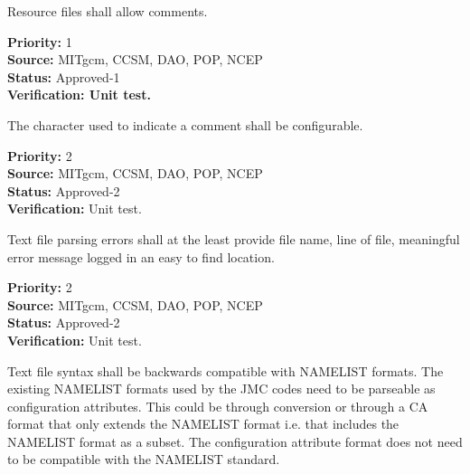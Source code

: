 



Resource files shall allow comments.

\begin{reqlist}
{\bf Priority:} 1 \\
{\bf Source:} MITgcm, CCSM, DAO, POP, NCEP \\
{\bf Status:}  Approved-1\\
{\bf Verification: Unit test.}  
\end{reqlist}


The character used to indicate a comment shall be configurable.

\begin{reqlist}
{\bf Priority:} 2 \\
{\bf Source:} MITgcm, CCSM, DAO, POP, NCEP \\
{\bf Status:}  Approved-2\\
{\bf Verification:}  Unit test.
\end{reqlist}


Text file parsing errors shall at the least provide
file name, line of file, meaningful error message logged in an easy
to find location.

\begin{reqlist}
{\bf Priority:} 2 \\
{\bf Source:} MITgcm, CCSM, DAO, POP, NCEP \\
{\bf Status:} Approved-2 \\
{\bf Verification:} Unit test.
\end{reqlist}


Text file syntax shall be backwards compatible with NAMELIST formats.
The existing NAMELIST formats used by the JMC codes need to be parseable
as configuration attributes. This could be through conversion or through
a CA format that only extends the NAMELIST format i.e. that includes the
NAMELIST format as a subset.  The configuration attribute format does 
not need to be compatible with the NAMELIST standard.

